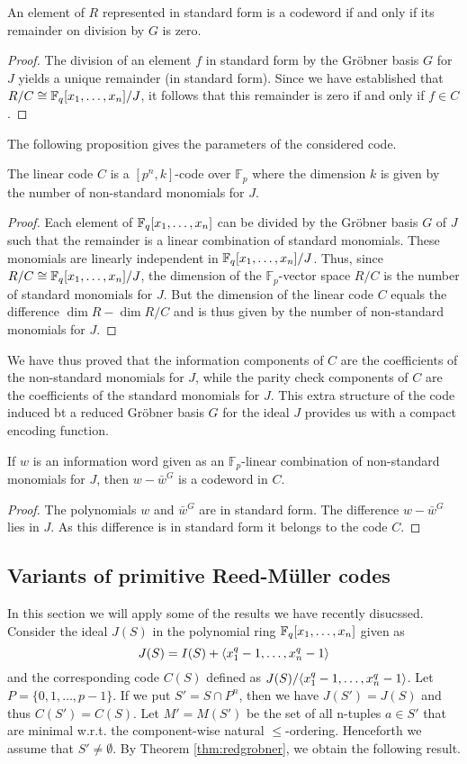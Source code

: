 \documentclass[english,bachelor]{liumaiex}
\begin{document}
\begin{prop}
An element of $R$ represented in standard form is a codeword if and only if its remainder on division by $G$ is zero.
\end{prop}
\begin{proof}
The division of an element $f$ in standard form by the Gröbner basis $G$ for $J$ yields a unique remainder (in standard form). Since we have established that $R/C\cong\mathbb{F}_q[x_1,\dots,x_n]/J$, it follows that this remainder is zero if and only if $f\in C$.
\end{proof}
The following proposition gives the parameters of the considered code.
\begin{prop}
The linear code $C$ is a $[p^n,k]$-code over $\mathbb{F}_p$ where the dimension $k$ is given by the number of non-standard monomials for $J$.
\end{prop}
\begin{proof}
Each element of $\mathbb{F}_q[x_1,\dots,x_n]$ can be divided by the Gröbner basis $G$ of $J$ such that the remainder is a linear combination of standard monomials. These monomials are linearly independent in $\mathbb{F}_q[x_1,\dots,x_n]/J$. Thus, since $R/C\cong\mathbb{F}_q[x_1,\dots,x_n]/J$, the dimension of the $\mathbb{F}_p$-vector space $R/C$ is the number of standard monomials for $J$. But the dimension of the linear code $C$ equals the difference $\dim R-\dim R/C$ and is thus given by the number of non-standard monomials for $J$.
\end{proof}
We have thus proved that the information components of $C$ are the coefficients of the non-standard monomials for $J$, while the parity check components of $C$ are the coefficients of the standard monomials for $J$. This extra structure of the code induced bt a reduced Gröbner basis $G$ for the ideal $J$ provides us with a compact encoding function.
\begin{prop}
If $w$ is an information word given as an $\mathbb{F}_p$-linear combination of non-standard monomials for $J$, then $w-\bar{w}^G$ is a codeword in $C$.
\end{prop}
\begin{proof}
The polynomials $w$ and $\bar{w}^G$ are in standard form. The difference $w-\bar{w}^G$ lies in $J$. As this difference is in standard form it belongs to the code $C$.
\end{proof}
\subsection{Variants of primitive Reed-M{\"u}ller codes}
In this section we will apply some of the results we have recently disucssed. Consider the ideal $J(S)$ in the polynomial ring $\mathbb{F}_q[x_1,\dots,x_n]$ given as
\begin{displaymath}
J(S)=I(S)+\langle x_1^q-1,\dots,x_n^q-1\rangle
\end{displaymath}
and the corresponding code $C(S)$ defined as $J(S)/\langle x_1^q-1,\dots,x_n^q-1\rangle$. Let $P = \{0,1,\dots,p-1\}$. If we put $S'=S\cap P^n$, then we have $J(S')=J(S)$ and thus $C(S')=C(S)$. Let $M'=M(S')$ be the set of all n-tuples $a\in S'$ that are minimal w.r.t. the component-wise natural $\leq$-ordering. Henceforth we assume that $S'\neq\emptyset$. By Theorem \ref{thm:redgrobner}, we obtain the following result.
\end{document}
